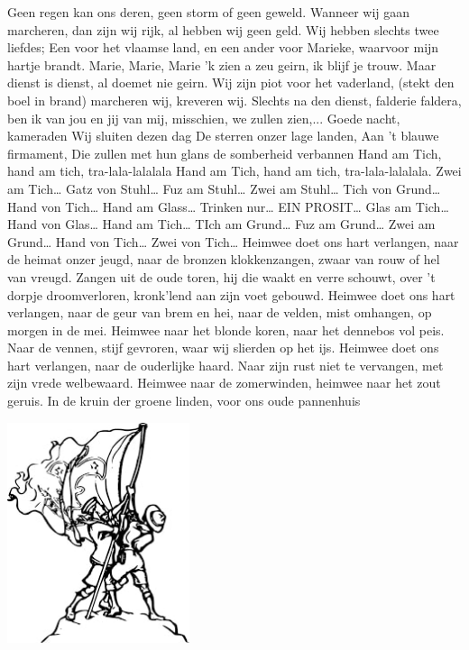 \documentclass{article}
\begin{document}
\begin{songs}{}
\endsong
{}
\beginverse*
Geen regen kan ons deren, 
geen storm of geen geweld. 
Wanneer wij gaan marcheren, 
dan zijn wij rijk,
al hebben wij geen geld. 
Wij hebben slechts twee liefdes; 
Een voor het vlaamse land, 
en een ander voor Marieke, 
waarvoor mijn hartje brandt. 
Marie, Marie, Marie 'k zien a zeu geirn, 
ik blijf je trouw. Maar dienst is dienst, 
al doemet nie geirn. 
Wij zijn piot voor het vaderland, 
(stekt den boel in brand) 
marcheren wij, kreveren wij. 
Slechts na den dienst, 
falderie faldera, 
ben ik van jou en jij van mij, 
misschien, we zullen zien,...
\endverse
\endsong
{}
\beginverse*
Goede nacht, kameraden
Wij sluiten dezen dag
De sterren onzer lage landen,
Aan 't blauwe firmament,
Die zullen met hun glans de somberheid verbannen
\endverse
\endsong
{}
\beginverse
Hand am Tich, hand am tich, tra-lala-lalalala
Hand am Tich, hand am tich, tra-lala-lalalala.
\endverse
\beginverse
Zwei am Tich…
\endverse
\beginverse
Gatz von Stuhl…
\endverse
\beginverse
Fuz am Stuhl…
\endverse
\beginverse
Zwei am Stuhl…
\endverse
\beginverse
Tich von Grund…
\endverse
\beginverse
Hand von Tich…
\endverse
\beginverse
Hand am Glass…
\endverse
\beginverse
Trinken nur…
\endverse
\beginverse
EIN PROSIT…
\endverse
\beginverse
Glas am Tich…
\endverse
\beginverse
Hand von Glas…
\endverse
\beginverse
Hand am Tich…
\endverse
\beginverse
TIch am Grund…
\endverse
\beginverse
Fuz am Grund…
\endverse
\beginverse
Zwei am Grund…
\endverse
\beginverse
Hand von Tich…
\endverse
\beginverse
Zwei von Tich…
\endverse
\endsong
{}
\beginverse*
Heimwee doet ons hart verlangen,
naar de heimat onzer jeugd, naar de bronzen klokkenzangen,
zwaar van rouw of hel van vreugd.
Zangen uit de oude toren,
hij die waakt en verre schouwt,
over 't dorpje droomverloren,
kronk’lend aan zijn voet gebouwd.
\endverse
\beginverse*
Heimwee doet ons hart verlangen,
naar de geur van brem en hei,
naar de velden, mist omhangen,
op morgen in de mei.
Heimwee naar het blonde koren,
naar het dennebos vol peis.
Naar de vennen, stijf gevroren, 
waar wij slierden op het ijs.
\endverse
\beginverse*
Heimwee doet ons hart verlangen,
naar de ouderlijke haard.
Naar zijn rust niet te vervangen,
met zijn vrede welbewaard.
Heimwee naar de zomerwinden,
heimwee naar het zout geruis.
In de kruin der groene linden, 
voor ons oude pannenhuis
\endverse
\endsong
\begin{intersong}
    \includegraphics[width=0.4\textwidth]{hetvendel}

\end{intersong}
\end{songs}
\end{document}
